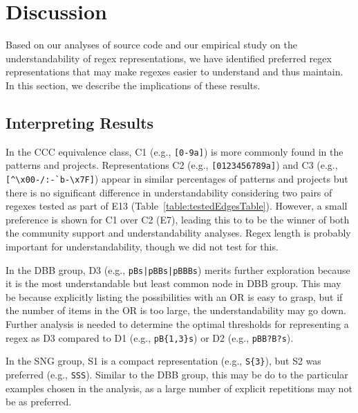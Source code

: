 \section{Discussion}
\label{sec:discussion}
Based on our analyses of source code and our empirical study on the understandability of regex representations, we have identified preferred regex representations that may make regexes easier to understand and thus maintain. In this section, we describe the implications of these results.

\subsection{Interpreting Results}
In the CCC equivalence class, C1 (e.g., \verb![0-9a]!) is more commonly found in the patterns and projects.  Representations C2 (e.g., \verb![0123456789a]!) and C3 (e.g., \verb![^\x00-/:-`b-\x7F]!) appear in similar percentages of patterns and projects but there is no significant difference in understandability considering two pairs of regexes tested as part of E13 (Table~\ref{table:testedEdgesTable}). However, a small preference is shown for C1 over C2 (E7), leading this to to be the winner of both the community support and understandability analyses.    Regex length is probably important for understandability, though we did not test for this.


In the DBB group, D3 (e.g., \verb!pBs|pBBs|pBBBs!) merits further exploration because it is the most understandable but least common node in DBB group.  This may be because explicitly listing the possibilities with an OR is easy to grasp, but if the number of items in the OR is too large, the understandability may go down. Further analysis is needed to determine the optimal thresholds for representing a regex as D3 compared to D1 (e.g., \verb!pB{1,3}s!) or D2 (e.g., \verb!pBB?B?s!).

In the SNG group, S1 is a compact representation (e.g., \verb!S{3}!), but S2 was preferred (e.g., \verb!SSS!). Similar to the DBB group, this may be do to the particular examples chosen in the analysis, as a large number of explicit repetitions may not be as preferred.

